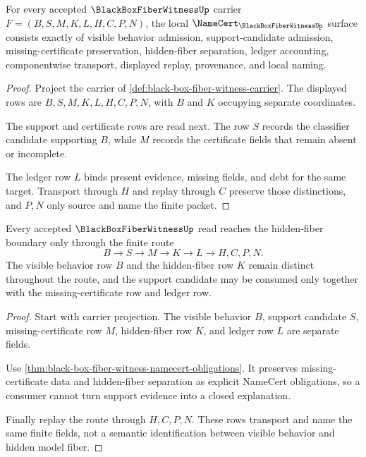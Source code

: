 \begin{theorem}
\label{thm:black-box-fiber-witness-namecert-obligations}
For every accepted $\BlackBoxFiberWitnessUp$ carrier $F=(B,S,M,K,L,H,C,P,N)$, the local $\NameCert_{\BlackBoxFiberWitnessUp}$ surface consists exactly of visible behavior admission, support-candidate admission, missing-certificate preservation, hidden-fiber separation, ledger accounting, componentwise transport, displayed replay, provenance, and local naming.
\end{theorem}
\begin{proof}
Project the carrier of \autoref{def:black-box-fiber-witness-carrier}. The displayed rows are $B,S,M,K,L,H,C,P,N$, with $B$ and $K$ occupying separate coordinates.

The support and certificate rows are read next. The row $S$ records the classifier candidate supporting $B$, while $M$ records the certificate fields that remain absent or incomplete.

The ledger row $L$ binds present evidence, missing fields, and debt for the same target. Transport through $H$ and replay through $C$ preserve those distinctions, and $P,N$ only source and name the finite packet.
\end{proof}

\begin{theorem}
\label{thm:black-box-fiber-witness-visible-hidden-route}
Every accepted $\BlackBoxFiberWitnessUp$ read reaches the hidden-fiber boundary only through the finite route
$$
B \longrightarrow S \longrightarrow M \longrightarrow K \longrightarrow L \longrightarrow H,C,P,N .
$$
The visible behavior row $B$ and the hidden-fiber row $K$ remain distinct throughout the route, and the support candidate may be consumed only together with the missing-certificate row and ledger row.
\end{theorem}
\begin{proof}
Start with carrier projection. The visible behavior $B$, support candidate $S$, missing-certificate row $M$, hidden-fiber row $K$, and ledger row $L$ are separate fields.

Use \autoref{thm:black-box-fiber-witness-namecert-obligations}. It preserves missing-certificate data and hidden-fiber separation as explicit NameCert obligations, so a consumer cannot turn support evidence into a closed explanation.

Finally replay the route through $H,C,P,N$. These rows transport and name the same finite fields, not a semantic identification between visible behavior and hidden model fiber.
\end{proof}

